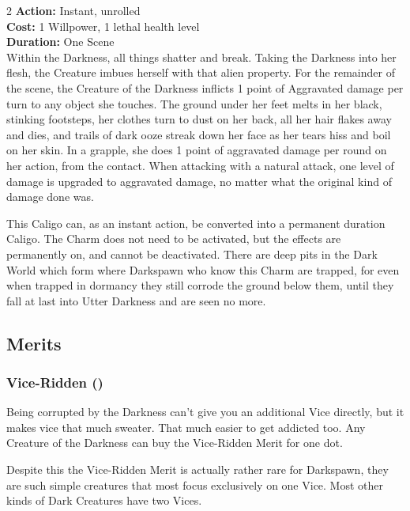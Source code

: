 \begin{multicols}{2}
\noindent \textbf{Action:} Instant, unrolled\\

\noindent \textbf{Cost:} 1 Willpower, 1 lethal health level\\

\noindent \textbf{Duration:} One Scene\\

\noindent Within the Darkness, all things shatter and break. Taking the Darkness into her flesh, the Creature imbues herself with that alien property. For the remainder of the scene, the Creature of the Darkness inflicts 1 point of Aggravated damage per turn to any object she touches. The ground under her feet melts in her black, stinking footsteps, her clothes turn to dust on her back, all her hair flakes away and dies, and trails of dark ooze streak down her face as her tears hiss and boil on her skin. In a grapple, she does 1 point of aggravated damage per round on her action, from the contact. When attacking with a natural attack, one level of damage is upgraded to aggravated damage, no matter what the original kind of damage done was.

This Caligo can, as an instant action, be converted into a permanent duration Caligo. The Charm does not need to be activated, but the effects are permanently on, and cannot be deactivated. There are deep pits in the Dark World which form where Darkspawn who know this Charm are trapped, for even when trapped in dormancy they still corrode the ground below them, until they fall at last into Utter Darkness and are seen no more.\\

\subsection*{Merits}

\subsubsection*{Vice-Ridden (\textbullet)}

Being corrupted by the Darkness can't give you an additional Vice directly, but it makes vice that much sweater. That much easier to get addicted too. Any Creature of the Darkness can buy the Vice-Ridden Merit for one dot. 

Despite this the Vice-Ridden Merit is actually rather rare for Darkspawn, they are such simple creatures that most focus exclusively on one Vice. Most other kinds of Dark Creatures have two Vices. 


\end{multicols}
